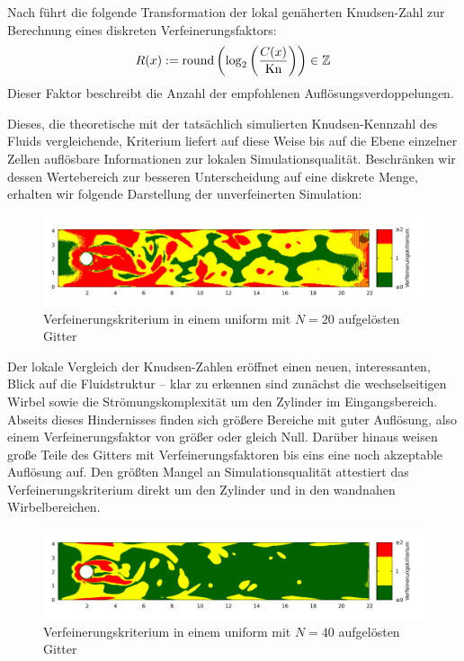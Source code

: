 \begin{Definition}
Nach \cite[vgl.~(29)]{Lagrava15} führt die folgende Transformation der lokal genäherten Knudsen-Zahl zur Berechnung eines diskreten Verfeinerungsfaktors:
\[ R(x) := \text{round}\left( \log_2 \left( \frac{C(x)}{\text{Kn}} \right) \right) \in \mathbb{Z} \]
Dieser Faktor beschreibt die Anzahl der empfohlenen Auflösungsverdoppelungen.
\end{Definition}

Dieses, die theoretische mit der tatsächlich simulierten Knudsen-Kennzahl des Fluids vergleichende, Kriterium liefert auf diese Weise bis auf die Ebene einzelner Zellen auflösbare Informationen zur lokalen Simulationsqualität. Beschränken wir dessen Wertebereich zur besseren Unterscheidung auf eine diskrete Menge, erhalten wir folgende Darstellung der unverfeinerten Simulation:

\begin{figure}[H]
\begin{adjustbox}{center}
\includegraphics[width=1.2\textwidth]{img/static/cylinder2d_unrefined_n20_re100_16s_knudsen.pdf}
\end{adjustbox}
\caption{Verfeinerungskriterium in einem uniform mit \(N=20\) aufgelösten Gitter}
\label{fig:UnrefinedCylinderKnudsen60s}
\end{figure}

Der lokale Vergleich der Knudsen-Zahlen eröffnet einen neuen, interessanten, Blick auf die Fluidstruktur -- klar zu erkennen sind zunächst die wechselseitigen Wirbel sowie die Strömungskomplexität um den Zylinder im Eingangsbereich. Abseits dieses Hindernisses finden sich größere Bereiche mit guter Auflösung, also einem Verfeinerungsfaktor von größer oder gleich Null. Darüber hinaus weisen große Teile des Gitters mit Verfeinerungsfaktoren bis eins eine noch akzeptable Auflösung auf. Den größten Mangel an Simulationsqualität attestiert das Verfeinerungskriterium direkt um den Zylinder und in den wandnahen Wirbelbereichen.

\begin{figure}[H]
\begin{adjustbox}{center}
\includegraphics[width=1.2\textwidth]{img/static/cylinder2d_unrefined_n40_re100_16s_knudsen.pdf}
\end{adjustbox}
\caption{Verfeinerungskriterium in einem uniform mit \(N=40\) aufgelösten Gitter}
\label{fig:UnrefinedCylinderKnudsenN4060s}
\end{figure}

